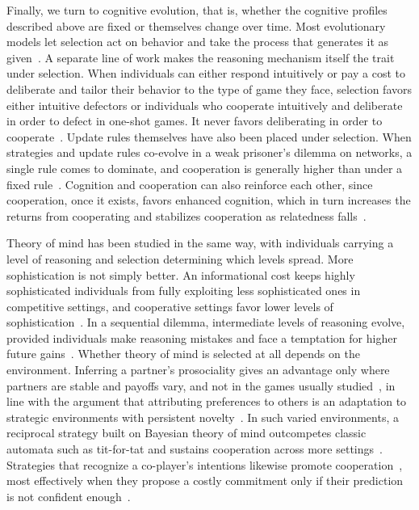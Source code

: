 
Finally, we turn to cognitive evolution, that is, whether the cognitive profiles described above are fixed or themselves change over time. Most evolutionary models let selection act on behavior and take the process that generates it as given~\cite{hanSocialPhysicsAge2026}. A separate line of work makes the reasoning mechanism itself the trait under selection. When individuals can either respond intuitively or pay a cost to deliberate and tailor their behavior to the type of game they face, selection favors either intuitive defectors or individuals who cooperate intuitively and deliberate in order to defect in one-shot games. It never favors deliberating in order to cooperate~\cite{Bear2016}. Update rules themselves have also been placed under selection. When strategies and update rules co-evolve in a weak prisoner's dilemma on networks, a single rule comes to dominate, and cooperation is generally higher than under a fixed rule~\cite{Cardillo2010}. Cognition and cooperation can also reinforce each other, since cooperation, once it exists, favors enhanced cognition, which in turn increases the returns from cooperating and stabilizes cooperation as relatedness falls~\cite{dossantosCoevolutionCooperationCognition2018}.

Theory of mind has been studied in the same way, with individuals carrying a level of reasoning and selection determining which levels spread. More sophistication is not simply better. An informational cost keeps highly sophisticated individuals from fully exploiting less sophisticated ones in competitive settings, and cooperative settings favor lower levels of sophistication~\cite{Devaine2014}. In a sequential dilemma, intermediate levels of reasoning evolve, provided individuals make reasoning mistakes and face a temptation for higher future gains~\cite{Lenaerts2024}. Whether theory of mind is selected at all depends on the environment. Inferring a partner's prosociality gives an advantage only where partners are stable and payoffs vary, and not in the games usually studied~\cite{Qi2022}, in line with the argument that attributing preferences to others is an adaptation to strategic environments with persistent novelty~\cite{Kimbrough2013}. In such varied environments, a reciprocal strategy built on Bayesian theory of mind outcompetes classic automata such as tit-for-tat and sustains cooperation across more settings~\cite{KleimanWeiner2025}. Strategies that recognize a co-player's intentions likewise promote cooperation~\cite{Han2011}, most effectively when they propose a costly commitment only if their prediction is not confident enough~\cite{Han2015}.


